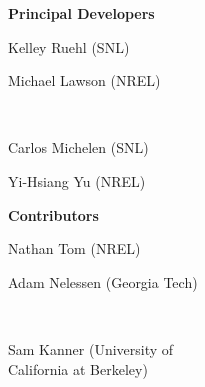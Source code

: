 \textbf{Principal Developers} \\
{\begin{minipage}[c]{0.5\textwidth} 
\begin{center} 
Kelley Ruehl (SNL) \\
\end{center} 
\end{minipage}}
%
%
{\begin{minipage}[c]{0.5\textwidth} 
\begin{center} 
Michael Lawson (NREL) \\
\end{center} 
\end{minipage}}
%
\\
\vspace{1cm}
{\begin{minipage}{0.5\textwidth} %
\begin{center} 
Carlos Michelen (SNL) \\
\end{center} 
\end{minipage}}
{\begin{minipage}{0.5\textwidth} %
\begin{center} 
Yi-Hsiang Yu (NREL) 
\end{center} 
\end{minipage}}
%
\textbf{Contributors} \\
{\begin{minipage}[c]{0.5\textwidth} 
\begin{center} 
Nathan Tom (NREL) \\
\end{center} 
\end{minipage}}
%
%
{\begin{minipage}[c]{0.5\textwidth} 
\begin{center} 
Adam Nelessen (Georgia Tech)  \\
\end{center} 
\end{minipage}}
%
\\
{\begin{minipage}{0.5\textwidth} %
\begin{center} 
Sam Kanner (University of \\California at Berkeley) \\
\end{center} 
\end{minipage}}

